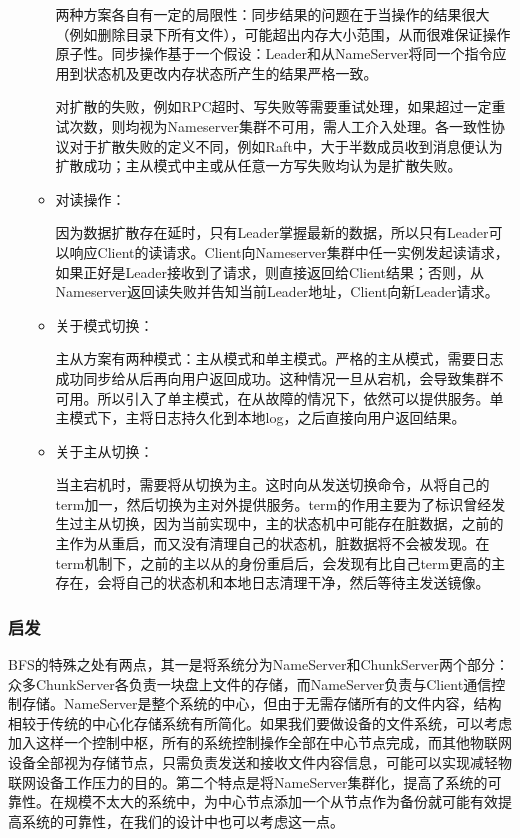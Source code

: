 \documentclass{ctexart}
\begin{document}
\begin{enumerate}
\begin{itemize}
		两种方案各自有一定的局限性：同步结果的问题在于当操作的结果很大（例如删除目录下所有文件），可能超出内存大小范围，从而很难保证操作原子性。同步操作基于一个假设：Leader和从NameServer将同一个指令应用到状态机及更改内存状态所产生的结果严格一致。
		
		对扩散的失败，例如RPC超时、写失败等需要重试处理，如果超过一定重试次数，则均视为Nameserver集群不可用，需人工介入处理。各一致性协议对于扩散失败的定义不同，例如Raft中，大于半数成员收到消息便认为扩散成功；主从模式中主或从任意一方写失败均认为是扩散失败。
		\item 对读操作：
		
		因为数据扩散存在延时，只有Leader掌握最新的数据，所以只有Leader可以响应Client的读请求。Client向Nameserver集群中任一实例发起读请求，如果正好是Leader接收到了请求，则直接返回给Client结果；否则，从Nameserver返回读失败并告知当前Leader地址，Client向新Leader请求。
		\item 关于模式切换：
		
		主从方案有两种模式：主从模式和单主模式。严格的主从模式，需要日志成功同步给从后再向用户返回成功。这种情况一旦从宕机，会导致集群不可用。所以引入了单主模式，在从故障的情况下，依然可以提供服务。单主模式下，主将日志持久化到本地log，之后直接向用户返回结果。
		\item 关于主从切换：
		
		当主宕机时，需要将从切换为主。这时向从发送切换命令，从将自己的term加一，然后切换为主对外提供服务。term的作用主要为了标识曾经发生过主从切换，因为当前实现中，主的状态机中可能存在脏数据，之前的主作为从重启，而又没有清理自己的状态机，脏数据将不会被发现。在term机制下，之前的主以从的身份重启后，会发现有比自己term更高的主存在，会将自己的状态机和本地日志清理干净，然后等待主发送镜像。
	\end{itemize}
\end{enumerate}
\subsubsection{启发}
BFS的特殊之处有两点，其一是将系统分为NameServer和ChunkServer两个部分：众多ChunkServer各负责一块盘上文件的存储，而NameServer负责与Client通信控制存储。NameServer是整个系统的中心，但由于无需存储所有的文件内容，结构相较于传统的中心化存储系统有所简化。如果我们要做设备的文件系统，可以考虑加入这样一个控制中枢，所有的系统控制操作全部在中心节点完成，而其他物联网设备全部视为存储节点，只需负责发送和接收文件内容信息，可能可以实现减轻物联网设备工作压力的目的。第二个特点是将NameServer集群化，提高了系统的可靠性。在规模不太大的系统中，为中心节点添加一个从节点作为备份就可能有效提高系统的可靠性，在我们的设计中也可以考虑这一点。
\end{document}
